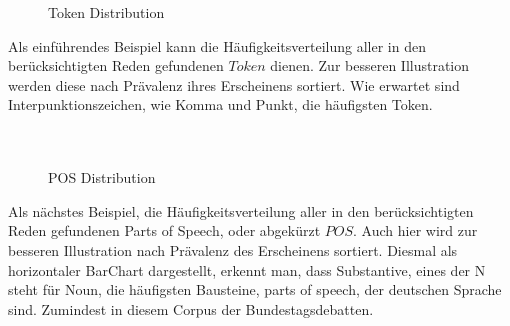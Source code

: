 \documentclass[10pt]{report}
\begin{document}
\begin{figure}[H]
	\begin{center}		
  	 \end{center}
	\caption{Token Distribution}	
\end{figure}


\noindent Als einführendes Beispiel kann die Häufigkeitsverteilung aller in den berücksichtigten Reden gefundenen $Token$ dienen. Zur besseren Illustration werden diese nach Prävalenz ihres Erscheinens sortiert. Wie erwartet sind Interpunktionszeichen, wie Komma und Punkt, die häufigsten Token. \\\\\\


\begin{figure}[H]
	\begin{center}		
  	 \end{center}
	\caption{POS  Distribution}	
 \end{figure}

\noindent Als nächstes Beispiel, die Häufigkeitsverteilung aller in den berücksichtigten Reden gefundenen Parts of Speech, oder abgekürzt $POS$. Auch hier wird zur besseren Illustration  nach Prävalenz des Erscheinens sortiert. Diesmal als horizontaler BarChart dargestellt, erkennt man, dass Substantive, eines der N steht für Noun, die häufigsten Bausteine, parts of speech, der deutschen Sprache sind. Zumindest in diesem Corpus der Bundestagsdebatten.\\\\
\end{document}
